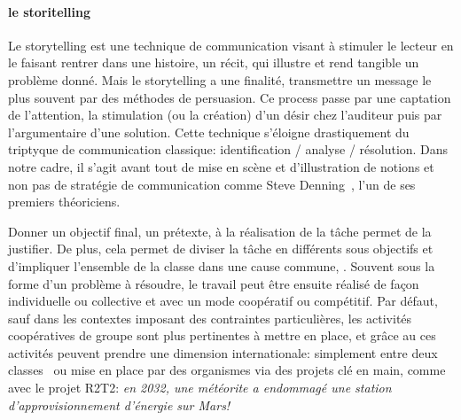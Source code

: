     \paragraph{le storitelling}\label{sec:storitell}
        Le storytelling est une technique de communication visant à stimuler le lecteur en le faisant rentrer dans une histoire, un récit, qui illustre et rend tangible un problème donné. Mais le storytelling a une finalité, transmettre un message le plus souvent par des méthodes de persuasion. Ce process passe par une captation de l'attention, la stimulation (ou la création) d'un désir chez l'auditeur puis par l'argumentaire d'une solution. Cette technique s'éloigne drastiquement du triptyque de communication classique: identification / analyse / résolution. 
        Dans notre cadre, il s'agit avant tout de mise en scène et d'illustration de notions et non pas de stratégie de communication comme Steve Denning~, l'un de ses premiers théoriciens.\par%
        Donner un objectif final, un prétexte, à la réalisation de la tâche permet de la justifier. De plus, cela permet de diviser la tâche en différents sous objectifs et d'impliquer l'ensemble de la classe dans une cause commune, .  Souvent sous la forme d'un problème à résoudre, le travail peut être ensuite réalisé de façon individuelle ou collective et avec un mode coopératif ou compétitif. Par défaut, \cad sauf dans les contextes imposant des contraintes particulières, les activités coopératives de groupe sont plus pertinentes à mettre en place, et grâce au  ces activités peuvent prendre une dimension internationale: simplement entre deux classes~ ou mise en place par des organismes via des projets clé en main, comme avec le projet R2T2: \textit{en 2032, une météorite a endommagé une station d'approvisionnement d'énergie sur Mars!}
